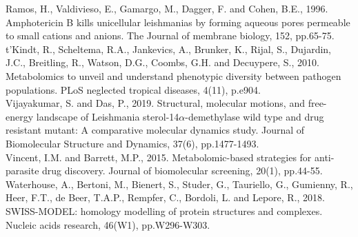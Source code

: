 \documentclass{bioinfo}
\begin{document}
Ramos, H., Valdivieso, E., Gamargo, M., Dagger, F. and Cohen, B.E.,
1996. Amphotericin B kills unicellular leishmanias by forming aqueous
pores permeable to small cations and anions. The Journal of membrane
biology, 152, pp.65-75.\\

t'Kindt, R., Scheltema, R.A., Jankevics, A., Brunker, K., Rijal, S.,
Dujardin, J.C., Breitling, R., Watson, D.G., Coombs, G.H. and Decuypere,
S., 2010. Metabolomics to unveil and understand phenotypic diversity
between pathogen populations. PLoS neglected tropical diseases, 4(11),
p.e904.\\

Vijayakumar, S. and Das, P., 2019. Structural, molecular motions, and
free-energy landscape of Leishmania sterol-14\(\alpha\)-demethylase wild
type and drug resistant mutant: A comparative molecular dynamics study.
Journal of Biomolecular Structure and Dynamics, 37(6), pp.1477-1493.\\

Vincent, I.M. and Barrett, M.P., 2015. Metabolomic-based strategies for
anti-parasite drug discovery. Journal of biomolecular screening, 20(1),
pp.44-55.\\

Waterhouse, A., Bertoni, M., Bienert, S., Studer, G., Tauriello, G.,
Gumienny, R., Heer, F.T., de Beer, T.A.P., Rempfer, C., Bordoli, L. and
Lepore, R., 2018. SWISS-MODEL: homology modelling of protein structures
and complexes. Nucleic acids research, 46(W1), pp.W296-W303.




\end{document}
